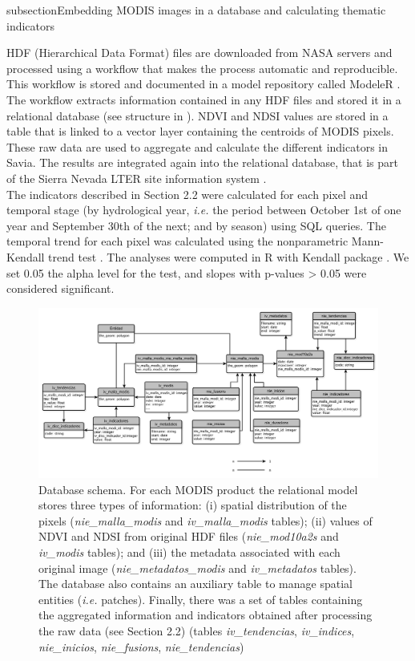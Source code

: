 subsection{Embedding MODIS images in a database and calculating thematic indicators}\label{sec:onto:Embedding}

HDF (Hierarchical Data Format) files are downloaded from NASA servers and processed using a workflow that makes the process automatic and reproducible. This workflow is stored and documented in a model repository called ModeleR \autocite{Bonetetal2014DocumentingStoring,PerezPerezetal2012ModeleREnviromental}. The workflow extracts information contained in any HDF files and stored it in a relational database (see structure in ). NDVI and NDSI values are stored in a table that is linked to a vector layer containing the centroids of MODIS pixels. These raw data are used to aggregate and calculate the different indicators in Savia. The results are integrated again into the relational database, that is part of the Sierra Nevada LTER site information system \autocite{BonetGarciaetal2011SierraNevada}.\\
The indicators described in Section 2.2 were calculated for each pixel and temporal stage (by hydrological year, \emph{i.e.} the period between October 1st of one year and September 30th of the next; and by season) using SQL queries. The temporal trend for each pixel was calculated using the nonparametric Mann-Kendall trend test \autocite{Kendall1970RankCorrelation,Mann1945NonparametricTests}. The analyses were computed in R \autocite{base} with Kendall package \autocite{McLeod2011KendallKendall}. We set 0.05 the alpha level for the test, and slopes with p-values \textgreater{} 0.05 were considered significant.

\begin{figure}
\centering
\includegraphics[]{img/onto/onto-database}\caption{Database schema. For each MODIS product the relational model stores three types of information: (i) spatial distribution of the pixels (\emph{nie\_malla\_modis} and \emph{iv\_malla\_modis} tables); (ii) values of NDVI and NDSI from original HDF files (\emph{nie\_mod10a2s} and \emph{iv\_modis} tables); and (iii) the metadata associated with each original image (\emph{nie\_metadatos\_modis} and \emph{iv\_metadatos} tables). The database also contains an auxiliary table to manage spatial entities (\emph{i.e.} \Qpy patches). Finally, there was a set of tables containing the aggregated information and indicators obtained after processing the raw data (see Section 2.2) (tables \emph{iv\_tendencias}, \emph{iv\_indices}, \emph{nie\_inicios}, \emph{nie\_fusions}, \emph{nie\_tendencias})}\label{fig:onto:database}
\end{figure}


